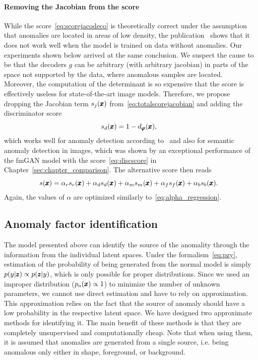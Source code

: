 \paragraph{Removing the Jacobian from the score} 
While the score~\eqref{eq:scorejacodeco} is theoretically correct under the assumption that anomalies are located in areas of low density, the publication~\cite{vsmidl2019anomaly} shows that it does not work well when the model is trained on data without anomalies. Our experiments shown below arrived at the same conclusion. We suspect the cause to be that the decoders $g$ can be arbitrary (with arbitrary jacobian) in parts of the space not supported by the data, where anomalous samples are located. Moreover, the computation of the determinant is so expensive that the score is effectively useless for state-of-the-art image models. Therefore, we propose dropping the Jacobian term $s_j(\pmb{{x}})$ from~\eqref{eq:totalscorejacobian} and adding the discriminator score
\begin{equation} \label{eq:discscore}
    s_d(\pmb{{x}}) = 1 - d_{\pmb{{\varphi}}}(\pmb{{x}}),
\end{equation}
which works well for anomaly detection according to~\cite{larsen2016autoencoding} and also for semantic anomaly detection in images, which was shown by an exceptional performance of the fmGAN model with the score~\eqref{eq:discscore} in Chapter~\ref{sec:chapter_comparison}. The alternative score then reads
\begin{equation} \label{eq:totalscoredisc}
    s(\pmb{{x}}) = \alpha_{r}  s_{r}(\pmb{{x}}) + \alpha_d s_d(\pmb{{x}}) + \alpha_m s_{m}(\pmb{{x}}) + \alpha_f s_{f}(\pmb{{x}}) + \alpha_b s_{b}(\pmb{{x}}).
\end{equation}
Again, the values of $\alpha$ are optimized similarly to~\eqref{eq:alpha_regression}.

\subsection{Anomaly factor identification}
\label{sec:anomaly_factor_identification}
The model presented above can identify the source of the anomality through the information from the individual latent spaces. Under the formalism~\eqref{eq:pzy}, estimation of the probability of being generated from the normal model is simply $p(y \vert \pmb{{z}})\propto p(\pmb{{z}} \vert y)$, which is only possible for proper distributions. Since we used an improper distribution ($p_a(\pmb{{x}})\propto 1$) to minimize the number of unknown parameters, we cannot use direct estimation and have to rely on approximation. This approximation relies on the fact that the source of anomaly should have a low probability in the respective latent space. We have designed two approximate methods for identifying it. The main benefit of these methods is that they are completely unsupervised and computationally cheap. Note that when using them, it is assumed that anomalies are generated from a single source, i.e. being anomalous only either in shape, foreground, or background. 

